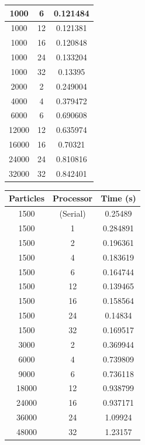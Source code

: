 \documentclass[12pt]{article}
\begin{document}
\begin{table}[h]
\begin{tabular}{||c c c||}
 \hline 
 1000 & 6 & 0.121484 \\ 
 \hline  
 1000 & 12  & 0.121381 \\
 \hline 
 1000 & 16 & 0.120848 \\ 
 \hline  
 1000 & 24 & 0.133204 \\
 \hline 
 1000 & 32 &  0.13395 \\ 
 \hline 
 2000 & 2 & 0.249004 \\
 \hline 
 4000 & 4 & 0.379472 \\
 \hline 
 6000 & 6 & 0.690608 \\ 
 \hline 
 12000 & 12 & 0.635974 \\
 \hline 
 16000 & 16 & 0.70321 \\
 \hline 
 24000 & 24 & 0.810816 \\
 \hline 
 32000 & 32 & 0.842401 \\
 \hline 

\end{tabular}
\end{table}
\begin{table}
\begin{tabular}{||c c c||} 
 \hline
 Particles & Processor & Time (s)  \\ [0.5ex] 
 \hline\hline 
 1500 & (Serial) & 0.25489 \\
 \hline 
 1500 & 1 & 0.284891 \\
 \hline 
 1500 & 2 & 0.196361  \\
 \hline  
 1500 & 4 & 0.183619 \\
 \hline 
 1500 & 6 & 0.164744  \\ 
 \hline  
 1500 & 12  & 0.139465 \\
 \hline 
 1500 & 16 & 0.158564  \\ 
 \hline  
 1500 & 24 &  0.14834 \\
 \hline 
 1500 & 32 &  0.169517 \\ 
 \hline 
 3000 & 2 & 0.369944  \\
 \hline 
 6000 & 4 &  0.739809  \\
 \hline 
 9000 & 6 & 0.736118 \\ 
 \hline 
 18000 & 12 & 0.938799 \\
 \hline 
 24000 & 16 & 0.937171 \\
 \hline 
 36000 & 24 & 1.09924 \\
 \hline 
 48000 & 32 & 1.23157  \\
 \hline 
\end{tabular}

\end{table} 
\end{document}
